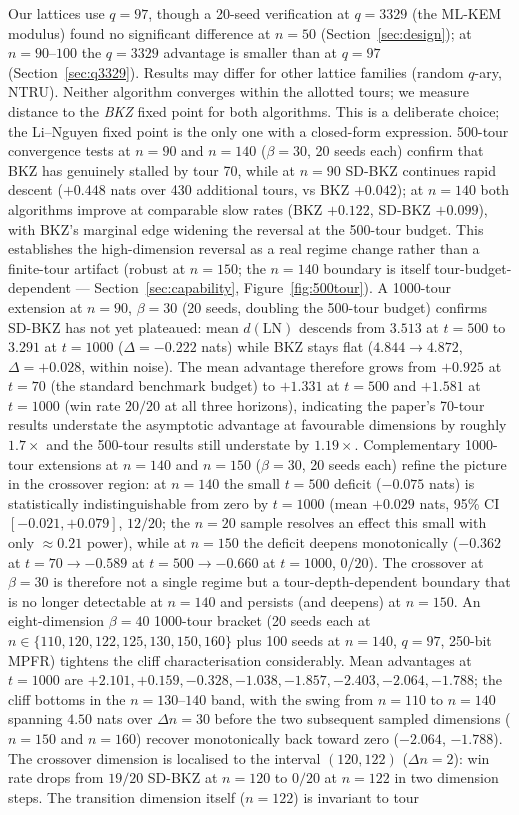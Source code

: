 \documentclass[journal=cic,version=preprint]{iacrj}
\begin{document}
Our lattices use $q=97$, though a 20-seed verification at $q=3329$ (the ML-KEM modulus) found no significant difference at $n=50$ (Section~\ref{sec:design}); at $n=90$--$100$ the $q=3329$ advantage is smaller than at $q=97$ (Section~\ref{sec:q3329}). Results may differ for other lattice families (random $q$-ary, NTRU). Neither algorithm converges within the allotted tours; we measure distance to the \emph{BKZ} fixed point for both algorithms. This is a deliberate choice; the Li--Nguyen fixed point is the only one with a closed-form expression. 500-tour convergence tests at $n=90$ and $n=140$ ($\beta=30$, 20 seeds each) confirm that BKZ has genuinely stalled by tour 70, while at $n=90$ SD-BKZ continues rapid descent ($+0.448$ nats over 430 additional tours, vs BKZ $+0.042$); at $n=140$ both algorithms improve at comparable slow rates (BKZ $+0.122$, SD-BKZ $+0.099$), with BKZ's marginal edge widening the reversal at the 500-tour budget. This establishes the high-dimension reversal as a real regime change rather than a finite-tour artifact (robust at $n=150$; the $n=140$ boundary is itself tour-budget-dependent --- Section~\ref{sec:capability}, Figure~\ref{fig:500tour}). A 1000-tour extension at $n=90$, $\beta=30$ (20 seeds, doubling the 500-tour budget) confirms SD-BKZ has not yet plateaued: mean $d(\mathrm{LN})$ descends from $3.513$ at $t=500$ to $3.291$ at $t=1000$ ($\Delta=-0.222$ nats) while BKZ stays flat ($4.844\to 4.872$, $\Delta=+0.028$, within noise). The mean advantage therefore grows from $+0.925$ at $t=70$ (the standard benchmark budget) to $+1.331$ at $t=500$ and $+1.581$ at $t=1000$ (win rate $20/20$ at all three horizons), indicating the paper's 70-tour results understate the asymptotic advantage at favourable dimensions by roughly $1.7\times$ and the 500-tour results still understate by $1.19\times$. Complementary 1000-tour extensions at $n=140$ and $n=150$ ($\beta=30$, 20 seeds each) refine the picture in the crossover region: at $n=140$ the small $t=500$ deficit ($-0.075$ nats) is statistically indistinguishable from zero by $t=1000$ (mean $+0.029$ nats, 95\% CI $[-0.021, +0.079]$, $12/20$; the $n=20$ sample resolves an effect this small with only ${\approx}0.21$ power), while at $n=150$ the deficit deepens monotonically ($-0.362$ at $t=70 \to -0.589$ at $t=500 \to -0.660$ at $t=1000$, $0/20$). The crossover at $\beta=30$ is therefore not a single regime but a tour-depth-dependent boundary that is no longer detectable at $n=140$ and persists (and deepens) at $n=150$. An eight-dimension $\beta=40$ 1000-tour bracket (20 seeds each at $n \in \{110, 120, 122, 125, 130, 150, 160\}$ plus 100 seeds at $n=140$, $q=97$, 250-bit MPFR) tightens the cliff characterisation considerably. Mean advantages at $t=1000$ are $+2.101, +0.159, -0.328, -1.038, -1.857, -2.403, -2.064, -1.788$; the cliff bottoms in the $n=130$--$140$ band, with the swing from $n=110$ to $n=140$ spanning $4.50$ nats over $\Delta n = 30$ before the two subsequent sampled dimensions ($n=150$ and $n=160$) recover monotonically back toward zero ($-2.064$, $-1.788$). The crossover dimension is localised to the interval $(120, 122)$ ($\Delta n = 2$): win rate drops from $19/20$ SD-BKZ at $n=120$ to $0/20$ at $n=122$ in two dimension steps. The transition dimension itself ($n=122$) is invariant to tour 
\end{document}
